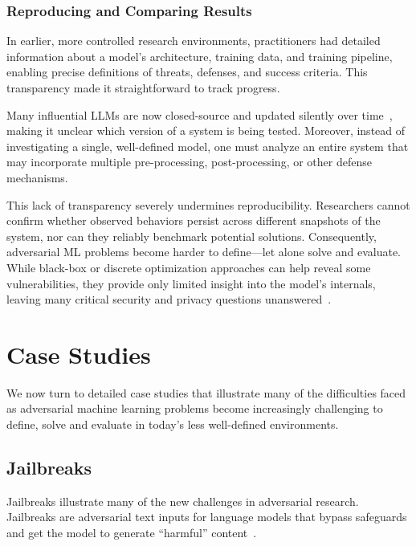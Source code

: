 \subsubsection{Reproducing and Comparing Results}
\label{sssec:reproducibility}

In earlier, more controlled research environments, practitioners had detailed information about a model’s architecture, training data, and training pipeline, enabling precise definitions of threats, defenses, and success criteria. This transparency made it straightforward to track progress.

Many influential LLMs are now closed-source and updated silently over time~\citep{chao2024jailbreakbench}, making it unclear which version of a system is being tested. Moreover, instead of investigating a single, well-defined model, one must analyze an entire system that may incorporate multiple pre-processing, post-processing, or other defense mechanisms.

This lack of transparency severely undermines reproducibility. Researchers cannot confirm whether observed behaviors persist across different snapshots of the system, nor can they reliably benchmark potential solutions. Consequently, adversarial ML problems become harder to define---let alone solve and evaluate. While black-box or discrete optimization approaches can help reveal some vulnerabilities, they provide only limited insight into the model’s internals,
leaving many critical security and privacy questions unanswered~\citep{casper2024black,carlini2024aligned}.

\section{Case Studies}
\label{sec:case_studies}

We now turn to detailed case studies that illustrate many of the difficulties faced as adversarial machine learning problems become increasingly challenging to define, solve and evaluate in today’s less well-defined environments.


\subsection{Jailbreaks} %
\label{sec:jailbreaks}

Jailbreaks illustrate many of the new challenges in adversarial research.
Jailbreaks are adversarial text inputs for language models that bypass safeguards and get the model to generate ``harmful'' content~\citep{wei2024jailbroken}.

